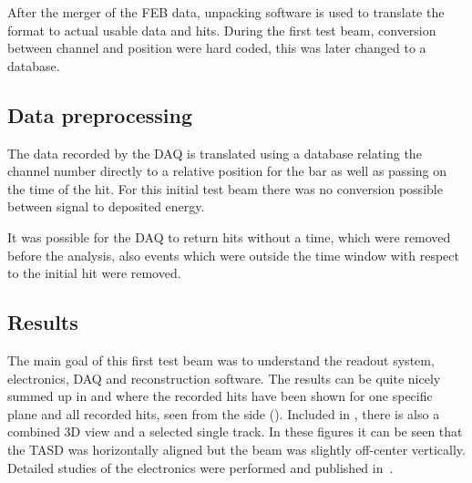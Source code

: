 After the merger of the FEB data, unpacking software is used to translate the format to actual usable data and hits. During the first test beam, conversion between channel and position were hard coded, this was later changed to a database.  


\subsection{Data preprocessing}

The data recorded by the DAQ is translated using a database relating the channel number directly to a relative position for the bar as well as passing on the time of the hit. For this initial test beam there was no conversion possible between signal to deposited energy.

It was possible for the DAQ to return hits without a time, which were removed before the analysis, also events which were outside the time window with respect to the initial hit were removed.

\subsection{Results}

The main goal of this first test beam was to understand the readout system, electronics, DAQ and reconstruction software. The results can be quite nicely summed up in  and  where the recorded hits have been shown for one specific plane and all recorded hits, seen from the side (). Included in , there is also a combined 3D view and a selected single track. In these figures it can be seen that the TASD was horizontally aligned but the beam was slightly off-center vertically. Detailed studies of the electronics were performed and published in~\cite{52Georgi}.

